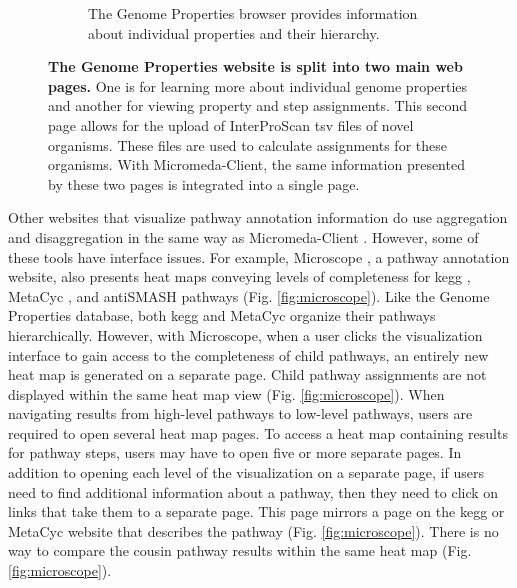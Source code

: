 \begin{figure}
\begin{subfigure}[b]{0.46\textwidth}
         \caption{The Genome Properties browser provides information about individual properties and their hierarchy.}
         \label{fig:property-browser}
     \end{subfigure}
     \caption[The Genome Properties website is split into two main web pages.]{\textbf{The Genome Properties website is split into two main web pages.} One is for learning more about individual genome properties and another for viewing property and step assignments. This second page allows for the upload of InterProScan \gls{tsv} files of novel organisms. These files are used to calculate assignments for these organisms. With Micromeda-Client, the same information presented by these two pages is integrated into a single page.}
     \label{fig:genome-properties-interface}
\end{figure}

Other websites that visualize pathway annotation information do use aggregation and disaggregation in the same way as Micromeda-Client \cite{vallenet2016microscope,darzi2019functree2}. However, some of these tools have interface issues. For example, Microscope \cite{vallenet2016microscope}, a pathway annotation website, also presents heat maps conveying levels of completeness for \gls{kegg} \cite{kanehisa2000kegg}, MetaCyc \cite{karp2002metacyc}, and antiSMASH \cite{blin2019antismash} pathways (Fig. \ref{fig:microscope}). Like the Genome Properties database, both \gls{kegg} and MetaCyc organize their pathways hierarchically. However, with Microscope, when a user clicks the visualization interface to gain access to the completeness of child pathways, an entirely new heat map is generated on a separate page. Child pathway assignments are not displayed within the same heat map view (Fig. \ref{fig:microscope}). When navigating results from high-level pathways to low-level pathways, users are required to open several heat map pages. To access a heat map containing results for pathway steps, users may have to open five or more separate pages. In addition to opening each level of the visualization on a separate page, if users need to find additional information about a pathway, then they need to click on links that take them to a separate page. This page mirrors a page on the \gls{kegg} or MetaCyc website that describes the pathway (Fig. \ref{fig:microscope}). There is no way to compare the cousin pathway results within the same heat map (Fig. \ref{fig:microscope}).

